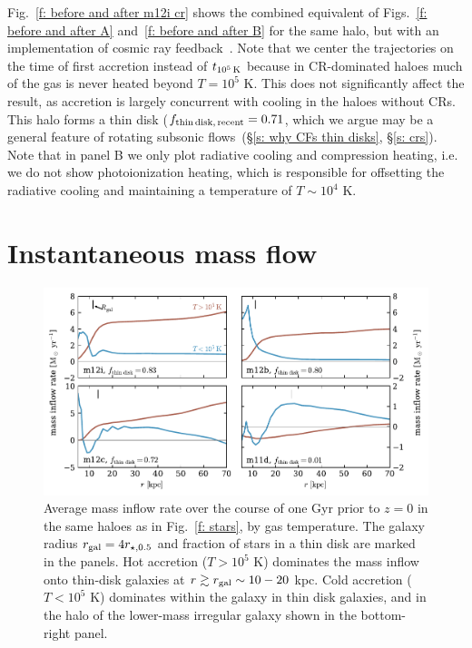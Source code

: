 \documentclass[fleqn,usenatbib]{mnras}
\newcommand{\fthin}{f_{\rm thin\,disk,\,recent}}
\newcommand{\tcools}{t_{10^5\,{\rm K}}}
\begin{document}
Fig.~\ref{f: before and after m12i cr} shows the combined equivalent of Figs.~\ref{f: before and after A} and~\ref{f: before and after B} for the same halo, but with an implementation of cosmic ray feedback~\cite{Chan2019, Hopkins2020a}.
Note that we center the trajectories on the time of first accretion instead of $\tcools$ because in CR-dominated haloes much of the gas is never heated beyond $T = 10^5$ K.
This does not significantly affect the result, as accretion is largely concurrent with cooling in the haloes without CRs.
This halo forms a thin disk ($\fthin=0.71$, which we argue may be a general feature of rotating subsonic flows~(\S\ref{s: why CFs thin disks}, \S\ref{s: crs}).
Note that in panel B we only plot radiative cooling and compression heating, i.e. we do not show photoionization heating, which is responsible for offsetting the radiative cooling and maintaining a temperature of $T \sim 10^4$ K.

\section{Instantaneous mass flow}
\label{s: appendix-mass flow}

\begin{figure}
    \centering
    \includegraphics{figures/Mdot.pdf}
    \caption{
    Average mass inflow rate over the course of one Gyr prior to $z=0$ in the same haloes as in Fig.~\ref{f: stars}, by gas temperature.
    The galaxy radius $r_{\rm gal}=4 r_{\star,0.5}$ and fraction of stars in a thin disk are marked in the panels. 
    Hot accretion ($T>10^5$ K) dominates the mass inflow onto thin-disk galaxies at $r \gtrsim r_{\rm gal} \sim 10-20$ kpc.
    Cold accretion ($T<10^5$ K) dominates within the galaxy in thin disk galaxies, and in the halo of the lower-mass irregular galaxy shown in the bottom-right panel.
    }
    \label{f: Mdot}
\end{figure}
\end{document}
